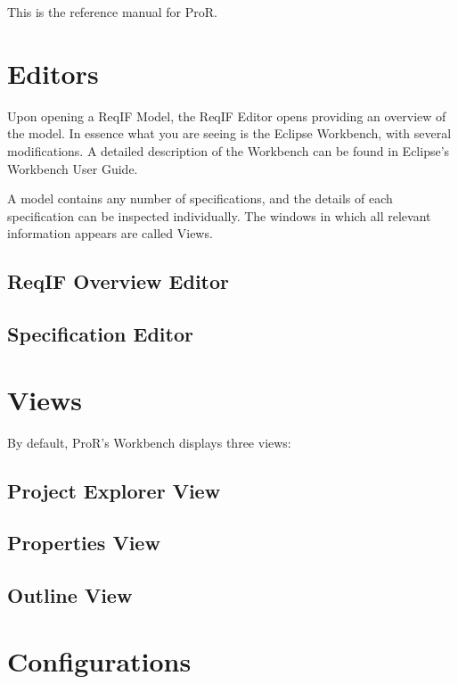 This is the reference manual for ProR.

\section{Editors}

Upon opening a ReqIF Model, the ReqIF Editor opens providing an overview of the model.  In essence what you are seeing is the Eclipse Workbench, with several modifications.  A detailed description of the Workbench can be found in Eclipse's Workbench User Guide.

A model contains any number of specifications, and the details of each specification can be inspected individually.  The windows in which all relevant information appears are called Views.

\subsection{ReqIF Overview Editor}



\subsection{Specification Editor}

\section{Views}

By default, ProR's Workbench displays three views:

\subsection{Project Explorer View}

\subsection{Properties View}

\subsection{Outline View}

\section{Configurations}

